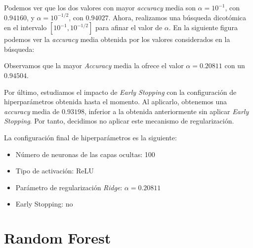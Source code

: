 \documentclass[a4]{article}
\begin{document}
Podemos ver que los dos valores con mayor \textit{accuracy} media son $\alpha=10^{-1}$, con $0.94160$, y $\alpha=10^{-1/2}$, con $0.94027$. Ahora, realizamos una búsqueda dicotómica en el intervalo $[10^{-1}, 10^{-1/2}]$ para afinar el valor de $\alpha$. En la siguiente figura podemos ver la \textit{accuracy} media obtenida por los valores considerados en la búsqueda:

\begin{figure}[H]
    \centering
	\label{fig:mlp_cv3}
\end{figure}

Observamos que la mayor \textit{Accuracy} media la ofrece el valor $\alpha=0.20811$ con un $0.94504$.

Por último, estudiamos el impacto de \textit{Early Stopping} con la configuración de hiperparámetros obtenida hasta el momento. Al aplicarlo, obtenemos una \textit{accuracy} media de $0.93198$, inferior a la obtenida anteriormente sin aplicar \textit{Early Stopping}. Por tanto, decidimos no aplicar este mecanismo de regularización.

La configuración final de hiperparámetros es la siguiente:

\begin{itemize}
    \item Número de neuronas de las capas ocultas: 100
    \item Tipo de activación: ReLU
    \item Parámetro de regularización \textit{Ridge}: $\alpha=0.20811$ 
    \item Early Stopping: no
\end{itemize}






\section{Random Forest}
\end{document}

